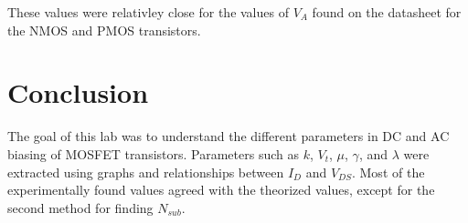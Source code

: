 \documentclass[11pt]{article}
\begin{document}
	These values were relativley close for the values of $V_A$ found on the
	datasheet for the NMOS and PMOS transistors. 

	\section{Conclusion}
	The goal of this lab was to understand the different parameters in
	DC and AC biasing of MOSFET transistors. Parameters such as $k$, $V_t$,
	$\mu$, $\gamma$, and $\lambda$ were extracted using graphs and relationships
	between $I_D$ and $V_{DS}$. Most of the experimentally found values agreed
	with the theorized values, except for the second method for finding
	$N_{sub}$.
\end{document}
